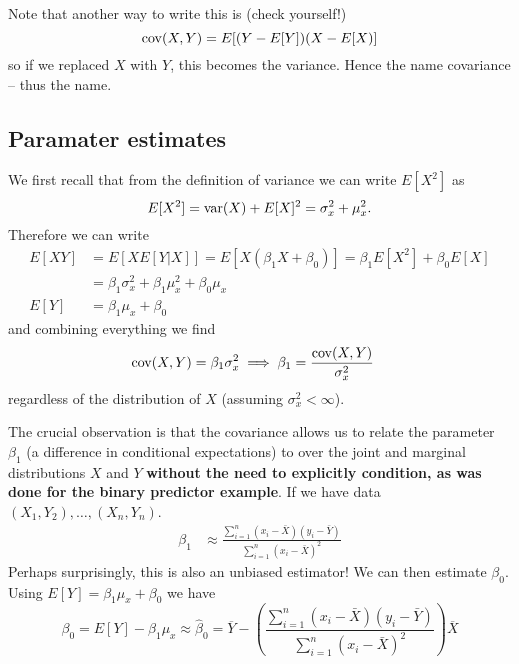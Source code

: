 Note that another way to write this is  (check yourself!)
\begin{equation*}
 {\rm cov}(X,Y) = E[(Y-E[Y])(X-E[X)] %
\end{equation*}
so if we replaced $X$ with $Y$, this becomes the variance. Hence the name covariance -- thus the name. 

\subsection{Paramater estimates}
We first recall that from the definition of variance we can write $E[X^2]$ as
\begin{equation*}
E[X^2] ={\rm var}(X) + E[X]^2 =  \sigma_x^2 + \mu_x^2. 
\end{equation*}
Therefore we can write 
\begin{align*}
E[XY] &= E[XE[Y|X]] = E[X(\beta_1 X+\beta_0)] = \beta_1E[X^2] + \beta_0 E[X] \\
&= \beta_1\sigma_x^2 +\beta_1 \mu_x^2 +\beta_0 \mu_x\\
E[Y] &= \beta_1\mu_x +\beta_0
\end{align*}
and combining everything we find 
\begin{align*}
{\rm cov}(X,Y) &= \beta_1\sigma_x^2 \implies \beta_1 = \frac{{\rm cov}(X,Y)}{\sigma_x^2}
\end{align*}
regardless of the distribution of $X$ (assuming $\sigma_x^2 <\infty$). 

The crucial observation is that the covariance allows us to relate the parameter $\beta_1$ (a difference in conditional expectations) to over the joint and marginal distributions $X$ and $Y$ {\bf without the need to explicitly condition, as was done for the binary predictor example}. If we have data  $(X_1,Y_2),\dots,(X_n,Y_n)$. 
\begin{align*}
 \beta_1 &\approx  \frac{\sum_{i=1}^n\left(x_i - \bar{X}\right)\left(y_i-\bar{Y}\right)}{\sum_{i=1}^n\left(x_i - \bar{X}\right)^2}
\end{align*}
Perhaps surprisingly, this is also an unbiased estimator!
We can then estimate $\beta_0$. Using $E[Y] = \beta_1 \mu_x + \beta_0$ we have
\begin{equation*}
\beta_0 =  E[Y]  - \beta_1 \mu_x \approx \hat{\beta}_0 =  \overline{Y} - \left(\frac{\sum_{i=1}^n\left(x_i - \bar{X}\right)\left(y_i-\bar{Y}\right)}{\sum_{i=1}^n\left(x_i - \bar{X}\right)^2}\right)\overline{X}
\end{equation*}



